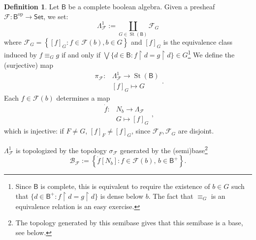 \documentclass[11pt]{amsart}
\newcommand{\F}{\mathcal{F}}
\theoremstyle{plain}
\theoremstyle{definition}
\newtheorem{definition}[theorem]{Definition}
\theoremstyle{plain}
\theoremstyle{remark}
\newcommand{\dSet}{\mathsf{Set}}
\DeclareMathOperator{\St}{St}
\newcommand{\bool}[1]{\mathsf{#1}}
\newcommand{\bp}[1]{\left\lbrace #1 \right\rbrace}
\newcommand{\0}{\mathsf{0}}
\renewcommand{\1}{\mathsf{1}}
\renewcommand{\2}{\mathsf{2}}
\theoremstyle{definition}
\begin{document}
  \begin{definition}
  \label{def:etbund1}
Let $\bool{B}$ be a complete boolean algebra.
Given a
 presheaf $\F:\bool{B}^{\textrm{op}}\to\dSet$, we set:
\[
\Lambda^1_\F:=\coprod_{G\in\St(\bool{B})}\F_G
\]
where
$\F_G=\bp{[f]_{G}: f\in\F(b), b\in G}$ and
$[f]_{G}$ is the equivalence class induced by $f\equiv_{G} g$ if and only if $\bigvee\{d\in \bool{B}:f\restriction d=g\restriction d\}\in G$\footnote{Since $\bool{B}$ is complete, this is equivalent to require the existence of $b\in G$ such that $\{d\in \bool{B}^+:f\restriction d=g\restriction d\}$ is dense below $b$. The fact that $\equiv_G$ is an equivalence relation is an easy exercise.}
We define the (surjective) map 
\[
\begin{aligned}
\pi_\F:& \Lambda^1_\F\to \St(\bool{B})\\ 
&[f]_{G}\mapsto G
\end{aligned}.
\]
Each $f\in\F(b)$ determines a map
\[
\begin{aligned}
\dot{f}:&N_b\to\Lambda_\F\\
&G\mapsto[f]_{G}
\end{aligned},
\]
which is injective: if $F\neq G$, $[f]_{F}\neq[f]_{ G}$, since $\F_F,\F_G$ are disjoint.

$\Lambda^1_\F$ is topologized by the topology $\sigma_\F$ generated by the (semi)base\footnote{The topology generated by this semibase gives that this semibase is a base, see below.}  
\[
\mathcal{B}_\F:=\bp{\dot{f}[N_b]: f\in\F(b), \, b\in\bool{B}^+}.
\]
\end{definition}
\end{document}
